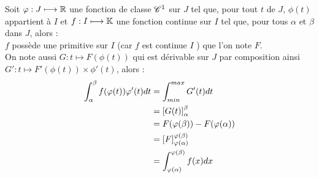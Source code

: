 \begin{dem}
    Soit \(\varphi  :J \longmapsto \mathbb{R}\) une fonction de classe \(\mathscr{C}^{1}\) sur \(J\) tel que, pour tout \(t\) de \(J\), \(\phi(t)\) appartient à \(I\) et \(f  :I\longmapsto \mathbb{K}\) une fonction continue sur \(I\) tel que, pour tous \(\alpha\) et \(\beta\) dans \(J\), alors : \\

    \(f\) possède une primitive sur \(I\) (car \(f\) est continue \(I\) ) que l'on note \(F\). \\
    On note aussi \(G:t\mapsto F(\phi(t))\) qui est dérivable sur \(J\) par composition ainsi \(G':t\mapsto F'(\phi(t))\times \phi'(t)\), alors :
    \[
    \begin{aligned}
        \int_{\alpha}^{\beta} f(\varphi(t))\varphi'(t)dt &= \int_{min}^{max} G'(t)dt \\
        &=\left[G(t)\right]_{\alpha}^{\beta} \\
        &=F(\varphi(\beta)) - F(\varphi(\alpha)) \\
        &= \left[F\right]_{\varphi(\alpha)}^{\varphi(\beta)} \\
        &= \int_{\varphi(\alpha)}^{\varphi(\beta)} f(x)dx
    \end{aligned}
    \]
\end{dem}
